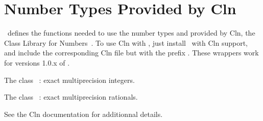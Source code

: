 \section{Number Types Provided by {\sc Cln}}
\label{CLN}


\cgal\ defines the functions needed to use the number types 
and  provided by {\sc Cln}, the Class Library for
Numbers~\cite{cln}.  To use {\sc Cln} with \cgal, just install \cgal\ with
{\sc Cln} support, and include the corresponding {\sc Cln} file but with the
prefix .  These wrappers work for versions 1.0.x of .


The class ~: exact multiprecision integers.


The class ~: exact multiprecision rationals.

See the {\sc Cln} documentation for additionnal details.
